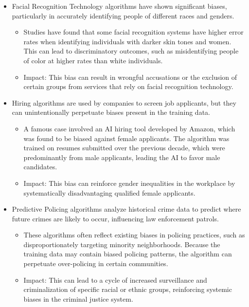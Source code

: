 \documentclass[
  letterpaper,
  DIV=11,
  numbers=noendperiod]{scrreprt}
\providecommand{\tightlist}{%
  \setlength{\itemsep}{0pt}\setlength{\parskip}{0pt}}\usepackage{longtable,booktabs,array}
\begin{document}
\begin{itemize}
\tightlist
\item
  Facial Recognition Technology algorithms have shown significant
  biases, particularly in accurately identifying people of different
  races and genders.

  \begin{itemize}
  \tightlist
  \item
    Studies have found that some facial recognition systems have higher
    error rates when identifying individuals with darker skin tones and
    women. This can lead to discriminatory outcomes, such as
    misidentifying people of color at higher rates than white
    individuals.
  \item
    Impact: This bias can result in wrongful accusations or the
    exclusion of certain groups from services that rely on facial
    recognition technology.
  \end{itemize}
\item
  Hiring algorithms are used by companies to screen job applicants, but
  they can unintentionally perpetuate biases present in the training
  data.

  \begin{itemize}
  \tightlist
  \item
    A famous case involved an AI hiring tool developed by Amazon, which
    was found to be biased against female applicants. The algorithm was
    trained on resumes submitted over the previous decade, which were
    predominantly from male applicants, leading the AI to favor male
    candidates.
  \item
    Impact: This bias can reinforce gender inequalities in the workplace
    by systematically disadvantaging qualified female applicants.
  \end{itemize}
\item
  Predictive Policing algorithms analyze historical crime data to
  predict where future crimes are likely to occur, influencing law
  enforcement patrols.

  \begin{itemize}
  \tightlist
  \item
    These algorithms often reflect existing biases in policing
    practices, such as disproportionately targeting minority
    neighborhoods. Because the training data may contain biased policing
    patterns, the algorithm can perpetuate over-policing in certain
    communities.
  \item
    Impact: This can lead to a cycle of increased surveillance and
    criminalization of specific racial or ethnic groups, reinforcing
    systemic biases in the criminal justice system.
  \end{itemize}
\end{itemize}
\end{document}
